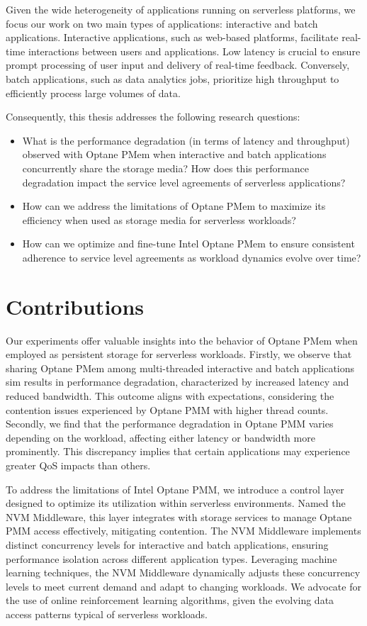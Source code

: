 Given the wide heterogeneity of applications running on serverless platforms, we focus our work on two main types of applications: interactive and batch applications. Interactive applications, such as web-based platforms, facilitate real-time interactions between users and applications. Low latency is crucial to ensure prompt processing of user input and delivery of real-time feedback. Conversely, batch applications, such as data analytics jobs, prioritize high throughput to efficiently process large volumes of data.

Consequently, this thesis addresses the following research questions:

\begin{itemize}
    \item What is the performance degradation (in terms of latency and throughput) observed with Optane PMem when interactive and batch applications concurrently share the storage media? How does this performance degradation impact the service level agreements of serverless applications?
    \item How can we address the limitations of Optane PMem to maximize its efficiency when used as storage media for serverless workloads?
    \item How can we optimize and fine-tune Intel Optane PMem to ensure consistent adherence to service level agreements as workload dynamics evolve over time?
\end{itemize}

\section{Contributions}

Our experiments offer valuable insights into the behavior of Optane PMem when employed as persistent storage for serverless workloads. Firstly, we observe that sharing Optane PMem among multi-threaded interactive and batch applications sim results in performance degradation, characterized by increased latency and reduced bandwidth. This outcome aligns with expectations, considering the contention issues experienced by Optane PMM with higher thread counts. Secondly, we find that the performance degradation in Optane PMM varies depending on the workload, affecting either latency or bandwidth more prominently. This discrepancy implies that certain applications may experience greater QoS impacts than others.

To address the limitations of Intel Optane PMM, we introduce a control layer designed to optimize its utilization within serverless environments. Named the NVM Middleware, this layer integrates with storage services to manage Optane PMM access effectively, mitigating contention. The NVM Middleware implements distinct concurrency levels for interactive and batch applications, ensuring performance isolation across different application types. Leveraging machine learning techniques, the NVM Middleware dynamically adjusts these concurrency levels to meet current demand and adapt to changing workloads. We advocate for the use of online reinforcement learning algorithms, given the evolving data access patterns typical of serverless workloads.

